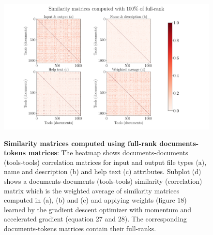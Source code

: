 \begin{figure}[h]
\begin{centering}
    {\includegraphics[scale=0.4]{figures/Similarity_matrices_100.pdf}}
    \caption[Similarity matrices computed using full-rank document-tokens matrices]{\textbf{Similarity matrices computed using full-rank documents-tokens matrices}: The heatmap shows documents-documents (tools-tools) correlation matrices for input and output file types (a), name and description (b) and help text (c) attributes. Subplot (d) shows a documents-documents (tools-tools) similarity (correlation) matrix which is the weighted average of similarity matrices computed in (a), (b) and (c) and applying weights (figure 18) learned by the gradient descent optimizer with momentum and accelerated gradient (equation 27 and 28). The corresponding documents-tokens matrices contain their full-ranks.}
\end{centering}
\end{figure}

